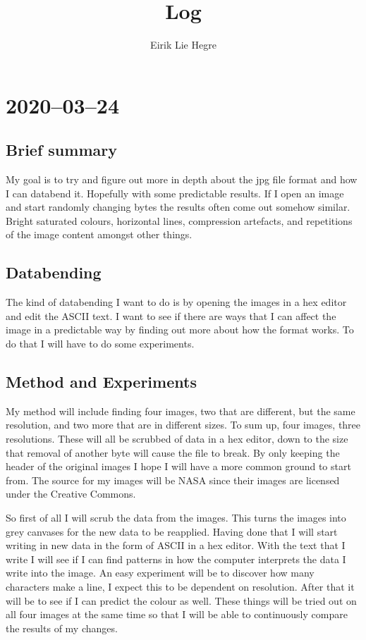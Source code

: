 \documentclass[12pt, letterpaper]{article}
\title{Log}
\author{Eirik Lie Hegre}
\begin{document}
\maketitle

\tableofcontents

\section{2020--03--24}

\subsection{Brief summary}
My goal is to try and figure out more in depth about the jpg file format and how
I can databend it. Hopefully with some predictable results. If I open an image
and start randomly changing bytes the results often come out somehow similar.
Bright saturated colours, horizontal lines, compression artefacts, and
repetitions of the image content amongst other things.

\subsection{Databending}
The kind of databending I want to do is by opening the images in a hex editor
and edit the ASCII text. I want to see if there are ways that I can affect the
image in a predictable way by finding out more about how the format works. To do
that I will have to do some experiments.

\subsection{Method and Experiments}
My method will include finding four images, two that are different, but the same
resolution, and two more that are in different sizes. To sum up, four images,
three resolutions. These will all be scrubbed of data in a hex editor, down to
the size that removal of another byte will cause the file to break. By only
keeping the header of the original images I hope I will have a more common
ground to start from. The source for my images will be NASA since their images
are licensed under the Creative Commons.

So first of all I will scrub the data from the images. This turns the images
into grey canvases for the new data to be reapplied. Having done that I will
start writing in new data in the form of ASCII in a hex editor. With the text
that I write I will see if I can find patterns in how the computer interprets
the data I write into the image. An easy experiment will be to discover how many
characters make a line, I expect this to be dependent on resolution. After that
it will be to see if I can predict the colour as well. These things will be
tried out on all four images at the same time so that I will be able to
continuously compare the results of my changes.
\end{document}
